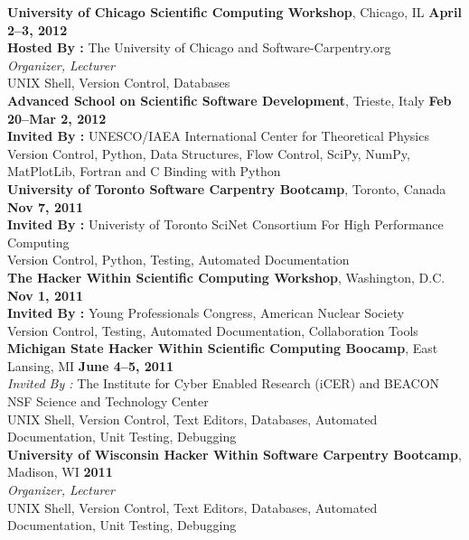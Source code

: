 \documentclass[margin,line]{resume}
\begin{document}
\begin{resume}
    \textbf{University of Chicago Scientific Computing Workshop}, Chicago, IL \hfill \textbf{April 2--3, 2012}\\
               \textbf{Hosted By : } The University of Chicago and Software-Carpentry.org \\
               \textsl{Organizer, Lecturer}\\
               UNIX Shell, Version Control, Databases\\
    \textbf{Advanced School on Scientific Software Development}, Trieste, Italy \hfill \textbf{Feb 20--Mar 2, 2012}\\
               \textbf{Invited By : } UNESCO/IAEA International Center for Theoretical Physics\\
               Version Control, Python, Data Structures, Flow Control, SciPy, NumPy, MatPlotLib, Fortran and C Binding with Python\\
    \textbf{University of Toronto Software Carpentry Bootcamp}, Toronto, Canada \hfill \textbf{Nov 7, 2011}\\
               \textbf{Invited By : } Univeristy of Toronto SciNet Consortium For High Performance Computing\\
               Version Control, Python, Testing, Automated Documentation\\
    \textbf{The Hacker Within Scientific Computing Workshop}, Washington, D.C. \hfill \textbf{Nov 1, 2011}\\
               \textbf{Invited By : } Young Professionals Congress, American Nuclear Society\\
               Version Control, Testing, Automated Documentation, Collaboration Tools\\
    \textbf{Michigan State Hacker Within Scientific Computing Boocamp}, East Lansing, MI \hfill \textbf{June 4--5, 2011}\\
               \textsl{Invited By : } The Institute for Cyber Enabled Research (iCER) and BEACON NSF Science and Technology Center \\ 
               UNIX Shell, Version Control, Text Editors, Databases, Automated Documentation, Unit Testing, Debugging\\
    \textbf{University of Wisconsin Hacker Within Software Carpentry Bootcamp}, Madison, WI \hfill\textbf{2011}\\
               \textsl{Organizer, Lecturer}\\
               UNIX Shell, Version Control, Text Editors, Databases, Automated Documentation, Unit Testing, Debugging\\

\end{resume}
\end{document}
